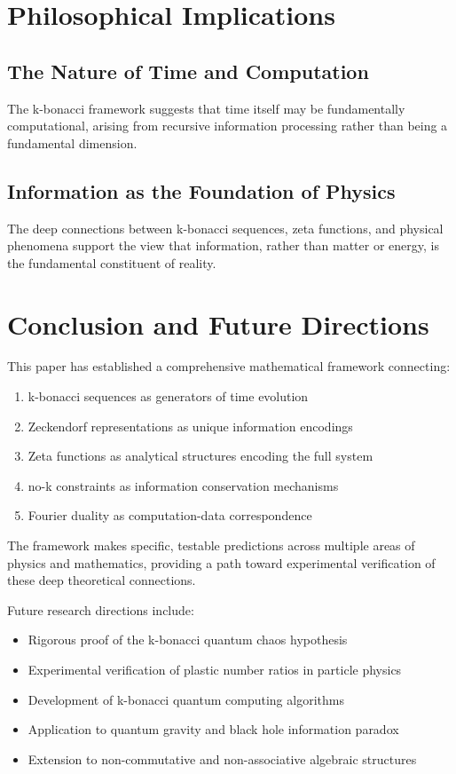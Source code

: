 \documentclass[12pt]{article}
\theoremstyle{plain}
\theoremstyle{definition}
\begin{document}
\section{Philosophical Implications}

\subsection{The Nature of Time and Computation}

The k-bonacci framework suggests that time itself may be fundamentally computational, arising from recursive information processing rather than being a fundamental dimension.

\subsection{Information as the Foundation of Physics}

The deep connections between k-bonacci sequences, zeta functions, and physical phenomena support the view that information, rather than matter or energy, is the fundamental constituent of reality.

\section{Conclusion and Future Directions}

This paper has established a comprehensive mathematical framework connecting:

\begin{enumerate}
\item k-bonacci sequences as generators of time evolution
\item Zeckendorf representations as unique information encodings
\item Zeta functions as analytical structures encoding the full system
\item no-k constraints as information conservation mechanisms
\item Fourier duality as computation-data correspondence
\end{enumerate}

The framework makes specific, testable predictions across multiple areas of physics and mathematics, providing a path toward experimental verification of these deep theoretical connections.

Future research directions include:
\begin{itemize}
\item Rigorous proof of the k-bonacci quantum chaos hypothesis
\item Experimental verification of plastic number ratios in particle physics
\item Development of k-bonacci quantum computing algorithms
\item Application to quantum gravity and black hole information paradox
\item Extension to non-commutative and non-associative algebraic structures
\end{itemize}
\end{document}
